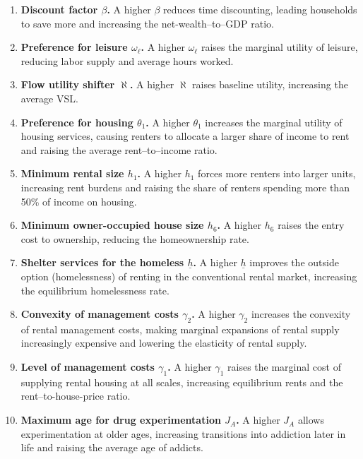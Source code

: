 \documentclass[parskip=full]{article}
\theoremstyle{plain}
\theoremstyle{definition}
\theoremstyle{remark}
\begin{document}
\begin{enumerate}
\setlength\itemsep{0.15em}

\item \textbf{Discount factor $\beta$.} A higher $\beta$ reduces time discounting, leading households to save more and increasing the net-wealth–to–GDP ratio.

\item \textbf{Preference for leisure $\omega_{\ell}$.} A higher $\omega_{\ell}$ raises the marginal utility of leisure, reducing labor supply and average hours worked.

\item \textbf{Flow utility shifter $\aleph$.} A higher $\aleph$ raises baseline utility, increasing the average VSL.

\item \textbf{Preference for housing $\theta_1$.} A higher $\theta_1$ increases the marginal utility of housing services, causing renters to allocate a larger share of income to rent and raising the average rent–to–income ratio.

\item \textbf{Minimum rental size $h_1$.} A higher $h_1$ forces more renters into larger units, increasing rent burdens and raising the share of renters spending more than 50\% of income on housing.

\item \textbf{Minimum owner-occupied house size $h_{6}$.} A higher $h_{6}$ raises the entry cost to ownership, reducing the homeownership rate.

\item \textbf{Shelter services for the homeless $\underline{h}$.} A higher $\underline{h}$ improves the outside option (homelessness) of renting in the conventional rental market, increasing the equilibrium homelessness rate.

\item \textbf{Convexity of management costs $\gamma_2$.} A higher $\gamma_2$ increases the convexity of rental management costs, making marginal expansions of rental supply increasingly expensive and lowering the elasticity of rental supply.

\item \textbf{Level of management costs $\gamma_1$.} A higher $\gamma_1$ raises the marginal cost of supplying rental housing at all scales, increasing equilibrium rents and the rent–to-house-price ratio.

\item \textbf{Maximum age for drug experimentation $J_A$.} A higher $J_A$ allows experimentation at older ages, increasing transitions into addiction later in life and raising the average age of addicts.


\end{enumerate}
\end{document}
